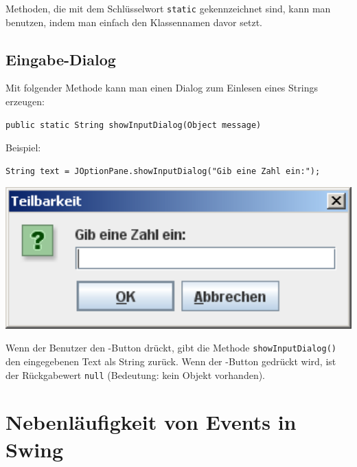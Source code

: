 \begin{center}
\begin{minipage}{1.0\textwidth}
\begin{framed}
Methoden, die mit dem Schlüsselwort \verb|static| gekennzeichnet sind, kann man
benutzen, indem man einfach den Klassennamen davor setzt.
\end{framed}
\end{minipage}
\end{center}

\subsection{Eingabe-Dialog}

Mit folgender Methode kann man einen Dialog zum Einlesen eines Strings erzeugen:

\begin{lstlisting}
public static String showInputDialog(Object message)
\end{lstlisting}

Beispiel:

\begin{lstlisting}
String text = JOptionPane.showInputDialog("Gib eine Zahl ein:");
\end{lstlisting}

\begin{minipage}{0.30\textwidth}
\centering
\includegraphics[width=1.0\textwidth]{./inf/SEKII/07_Java_Dialoge/InputDialog.png}
\end{minipage}\hfill
\begin{minipage}{0.6\textwidth}
Wenn der Benutzer den -Button drückt, gibt die Methode
\verb|showInputDialog()| den eingegebenen Text als String zurück. Wenn der
-Button gedrückt wird, ist der Rückgabewert \verb|null|
(Bedeutung: kein Objekt vorhanden).
\end{minipage}


\section{Nebenläufigkeit von Events in Swing}

